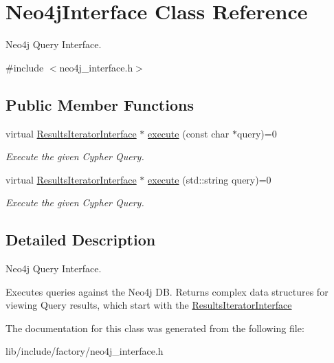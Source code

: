 \hypertarget{classNeo4jInterface}{\section{Neo4j\-Interface Class Reference}
\label{classNeo4jInterface}
}


Neo4j Query Interface.  




{\ttfamily \#include $<$neo4j\-\_\-interface.\-h$>$}

\subsection*{Public Member Functions}
\begin{DoxyCompactItemize}
\item 
\hypertarget{classNeo4jInterface_a93992c994fc63856a1952d304f5030c3}{virtual \hyperlink{classResultsIteratorInterface}{Results\-Iterator\-Interface} $\ast$ \hyperlink{classNeo4jInterface_a93992c994fc63856a1952d304f5030c3}{execute} (const char $\ast$query)=0}\label{classNeo4jInterface_a93992c994fc63856a1952d304f5030c3}

\begin{DoxyCompactList}\small\item\em Execute the given Cypher Query. \end{DoxyCompactList}\item 
\hypertarget{classNeo4jInterface_a25908b6389132c27fdd0f93b2fed749f}{virtual \hyperlink{classResultsIteratorInterface}{Results\-Iterator\-Interface} $\ast$ \hyperlink{classNeo4jInterface_a25908b6389132c27fdd0f93b2fed749f}{execute} (std\-::string query)=0}\label{classNeo4jInterface_a25908b6389132c27fdd0f93b2fed749f}

\begin{DoxyCompactList}\small\item\em Execute the given Cypher Query. \end{DoxyCompactList}\end{DoxyCompactItemize}


\subsection{Detailed Description}
Neo4j Query Interface. 

Executes queries against the Neo4j D\-B. Returns complex data structures for viewing Query results, which start with the \hyperlink{classResultsIteratorInterface}{Results\-Iterator\-Interface} 

The documentation for this class was generated from the following file\-:\begin{DoxyCompactItemize}
\item 
lib/include/factory/neo4j\-\_\-interface.\-h\end{DoxyCompactItemize}
